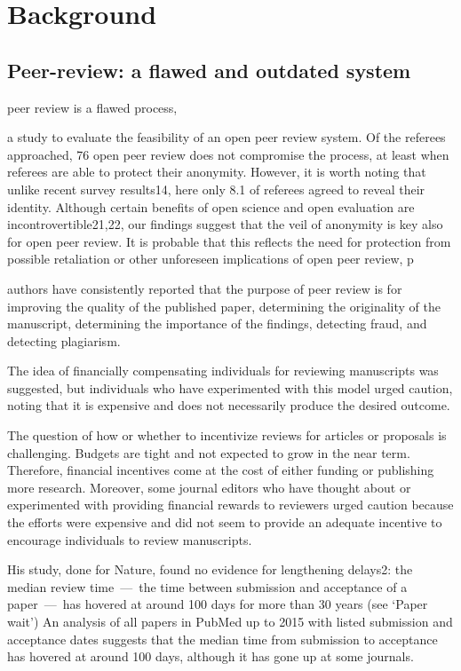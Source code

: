 \documentclass[runningheads]{llncs}
\begin{document}
\section{Background}
\subsection{Peer-review: a flawed and outdated system}
peer review is a ﬂawed process,\cite{Smith2006}

a study to evaluate the feasibility of an open peer review system.
\cite{Walsh200-openpeerrev} Of  the  referees  approached,  76%
\cite{PeerRev-NatComm}
open peer review does not compromise the process, at least when referees are able to protect their anonymity. However, it is worth noting that unlike recent survey results14, here only 8.1 of referees agreed to reveal their identity. Although certain beneﬁts of open science and open evaluation are incontrovertible21,22, our ﬁndings suggest that the veil of anonymity is key also for open peer review. It is probable that this reﬂects the need for protection from possible retaliation or other unforeseen implications of open peer review, p

\cite{Gropp-PeerRevStress}
authors have consistently reported that the purpose of peer review is for improving the quality of the published paper, determining the originality of the manuscript, determining the importance of the findings, detecting fraud, and detecting plagiarism.

The idea of financially compensating individuals for reviewing manuscripts was suggested, but individuals who have experimented with this model urged caution, noting that it is expensive and does not necessarily produce the desired outcome.

The question of how  or whether to incentivize reviews for articles or proposals is challenging. Budgets are tight and not expected to grow in the near term. Therefore, financial incentives come at the cost of either funding or publishing more research.
Moreover, some journal editors who have thought about or experimented with providing financial rewards to reviewers urged caution because the efforts were expensive and did not seem to provide an adequate incentive to encourage individuals to review manuscripts.

\cite{Kendall-peerrev}
His study, done for Nature, found no evidence for lengthening delays2: the median review time — the time between submission and acceptance of a paper — has hovered at around 100 days for more than 30 years (see ‘Paper wait’)
An analysis of all papers in PubMed up to 2015 with listed submission and acceptance dates suggests that the median time from submission to acceptance has hovered at around 100 days, although it has gone up at some journals.
\end{document}
